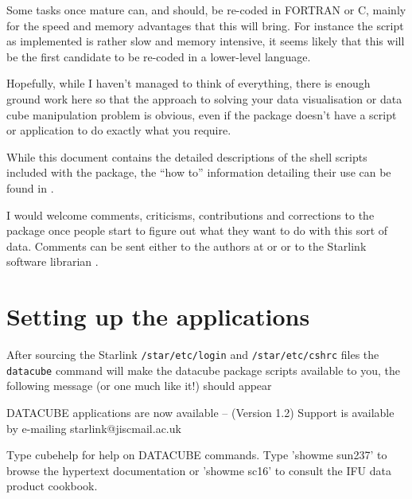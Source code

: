 \documentclass[twoside,11pt,nolof]{starlink}
\begin{document}
Some tasks once mature can, and should, be re-coded in FORTRAN or C,
mainly for the speed and memory advantages that this will bring. For
instance the  script as implemented is
rather slow and memory intensive, it seems likely that this will be
the first candidate to be re-coded in a lower-level language.

Hopefully, while I haven't managed to think of everything, there is
enough ground work here so that the approach to solving your data
visualisation or data cube manipulation problem is obvious, even if
the package doesn't have a script or application to do exactly what
you require.

While this document contains the detailed descriptions of the shell
scripts included with the package, the ``how to'' information
detailing their use can be found in .

I would welcome comments, criticisms, contributions and corrections to
the package once people start to figure out what they want to do with
this sort of data.  Comments can be sent either to the authors at
 or
 or
to the Starlink software librarian
.

\section{Setting up the applications\label{sun237_starting}}

After sourcing the Starlink \texttt{/star/etc/login} and \texttt{/star/etc/cshrc} files the \texttt{datacube} command will make the
datacube package scripts available to you, the following
message (or one much like it!) should appear

\begin{small}
\begin{terminalv}

  DATACUBE applications are now available -- (Version 1.2)
   Support is available by e-mailing starlink@jiscmail.ac.uk

       Type cubehelp for help on DATACUBE commands.
  Type 'showme sun237' to browse the hypertext documentation
  or 'showme sc16' to consult the IFU data product cookbook.

%
\end{terminalv}
\end{small}
\end{document}
